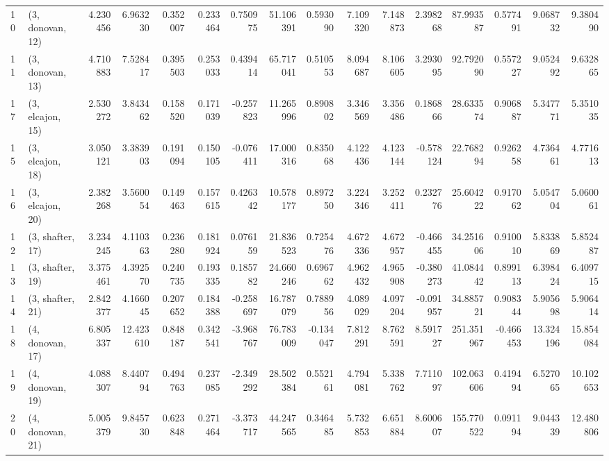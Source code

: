 \begin{tabular}{llrrrrrrrrrrrrrr}
10 &  (3, donovan, 12) &  4.230456 &   6.963230 &   0.352007 &  0.233464 &  0.750975 &   51.106391 &  0.593090 &   7.109320 &   7.148873 &  2.398268 &   87.993587 &  0.577491 &   9.068732 &   9.380490 \\
11 &  (3, donovan, 13) &  4.710883 &   7.528417 &   0.395503 &  0.253033 &  0.439414 &   65.717041 &  0.510553 &   8.094687 &   8.106605 &  3.293095 &   92.792090 &  0.557227 &   9.052492 &   9.632865 \\
17 &  (3, elcajon, 15) &  2.530272 &   3.843462 &   0.158520 &  0.171039 & -0.257823 &   11.265996 &  0.890802 &   3.346569 &   3.356486 &  0.186866 &   28.633574 &  0.906887 &   5.347771 &   5.351035 \\
15 &  (3, elcajon, 18) &  3.050121 &   3.383903 &   0.191094 &  0.150105 & -0.076411 &   17.000316 &  0.835068 &   4.122436 &   4.123144 & -0.578124 &   22.768294 &  0.926258 &   4.736461 &   4.771613 \\
16 &  (3, elcajon, 20) &  2.382268 &   3.560054 &   0.149463 &  0.157615 &  0.426342 &   10.578177 &  0.897250 &   3.224346 &   3.252411 &  0.232776 &   25.604222 &  0.917062 &   5.054704 &   5.060061 \\
12 &  (3, shafter, 17) &  3.234245 &   4.110363 &   0.236280 &  0.181924 &  0.076159 &   21.836523 &  0.725476 &   4.672336 &   4.672957 & -0.466455 &   34.251606 &  0.910010 &   5.833869 &   5.852487 \\
13 &  (3, shafter, 19) &  3.375461 &   4.392570 &   0.240735 &  0.193335 &  0.185782 &   24.660246 &  0.696762 &   4.962432 &   4.965908 & -0.380273 &   41.084442 &  0.899113 &   6.398424 &   6.409715 \\
14 &  (3, shafter, 21) &  2.842377 &   4.166045 &   0.207652 &  0.184388 & -0.258697 &   16.787079 &  0.788956 &   4.089029 &   4.097204 & -0.091957 &   34.885721 &  0.908344 &   5.905698 &   5.906414 \\
18 &  (4, donovan, 17) &  6.805337 &  12.423610 &   0.848187 &  0.342541 & -3.968767 &   76.783009 & -0.134047 &   7.812291 &   8.762591 &  8.591727 &  251.351967 & -0.466453 &  13.324196 &  15.854084 \\
19 &  (4, donovan, 19) &  4.088307 &   8.440794 &   0.494763 &  0.237085 & -2.349292 &   28.502384 &  0.552161 &   4.794081 &   5.338762 &  7.711097 &  102.063606 &  0.419494 &   6.527065 &  10.102653 \\
20 &  (4, donovan, 21) &  5.005379 &   9.845730 &   0.623848 &  0.271464 & -3.373717 &   44.247565 &  0.346485 &   5.732853 &   6.651884 &  8.600607 &  155.770522 &  0.091194 &   9.044339 &  12.480806 \\

\end{tabular}
